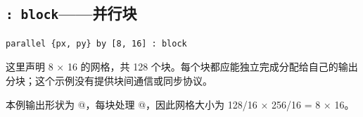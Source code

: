 \subsection*{\texttt{: block}——并行块}

\begin{lstlisting}[language=croqtile,caption={: block——并行块}]
parallel {px, py} by [8, 16] : block
\end{lstlisting}

这里声明 8 × 16 的网格，共 128 个块。每个块都应能独立完成分配给自己的输出分块；这个示例没有提供块间通信或同步协议。

本例输出形状为 \co@[128, 256]@，每块处理 \co@[16, 16]@，因此网格大小为 128/16 × 256/16 = 8 × 16。
